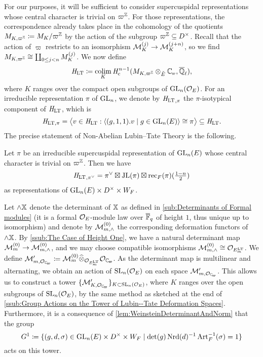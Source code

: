 \documentclass[../main.tex]{subfiles}
\begin{document}
For our purposes, it will be sufficient to consider supercuspidal representations
whose central character is trivial on $\varpi^{\mathbb{Z}}$. For those representations,
the correspondence already takes place in the cohomology of the 
quotients $M_{K, \varpi^{\mathbb{Z}}} \coloneqq M_K/\varpi^{\mathbb{Z}}$ by the action of the
subgroup $\varpi^{\mathbb{Z}} \subseteq D^\times$. Recall that the action of 
$\varpi$ restricts to an isomorphism $\mathcal{M}_K^{(j)} \to \mathcal{M}_K^{(j+n)}$, so we find
$M_{K, \varpi^{\mathbb{Z}}} \cong \coprod_{0 \leq j < n} M_{K}^{(j)}$. We now define
\begin{equation} \label{eq:defHLT}
  \HLT \coloneq \colim_{K} \hHc^{n-1} (M_{K, \varpi^\Z} \otimes_{\br E}\Cp, \bar \Q_\ell),
\end{equation}
where $K$ ranges over the compact open subgroups of $\operatorname{GL}_n(\mathcal{O}_E)$. 
For an irreducible representation $\pi$ of $\operatorname{GL}_n$, we denote by ${\mathit H_{\mathrm{LT}}}_{,\pi}$ the 
$\pi$-isotypical component of $\mathit H_{\mathrm{LT}}$, which is
\begin{equation*}
  \mathit H_{\mathrm{LT}, \pi} = \big\langle v \in \mathit H_{\mathrm{LT}} : \langle (g,1,1).v \mid g \in \operatorname{GL}_n(E) \rangle 
  \cong \pi \big\rangle \subseteq \mathit H_{\mathrm{LT}}.
\end{equation*}
The precise statement of Non-Abelian Lubin--Tate Theory is the following.
\begin{thm}\label{thm:NonAbLTT}
  Let $\pi$ be an irreducible supercuspidal representation of $\operatorname{GL}_n(E)$ whose central
  character is trivial on $\varpi^{\mathbb{Z}}$.   
  Then we have 
  \begin{equation*}
    {\mathit H_{\mathrm{LT}}}_{,\pi^\vee} = \pi^\vee \boxtimes \mathrm{JL}(\pi) \boxtimes \mathrm{rec}_F(\pi)(\tfrac{1-n}2)
  \end{equation*}
  as representations of $\operatorname{GL}_n(E) \times D^\times \times W_F$. 
\end{thm}

Let $\wedge \mathbb{X}$ denote the determinant of $\mathbb{X}$ as defined in 
\cref{sub:Determinants of Formal modules} (it is a formal $\mathcal{O}_E$-module law over
${\overline {\mathbb{F}}_q}$ of height $1$, thus unique up to isomorphism) 
and denote by $\mathcal{M}_{m, \wedge}^{(0)}$ the corresponding deformation functors of
$\wedge \mathbb{X}$. 
By \cref{ssub:The Case of Height One}, we have a natural
determinant map $\mathcal{M}_{m}^{(0)} \to \mathcal{M}_{m ,\wedge}^{(0)}$, and we may choose compatible
isomorphisms $\mathcal{M}_{m, \wedge}^{(0)} \cong \mathcal{O}_{E^{\mathrm{LT}}_m}$. 
We define $\cM'_{m,\cO_\Cp} \coloneq \cM_{m}^{(0)} \cotimes_{\cO_{E^\LT_m}} \cO_\Cp$.
As the determinant map is multilinear and alternating, we obtain an action of 
$\operatorname{SL}_n(\mathcal{O}_E)$ on each space $\cM'_{m,\cO_\Cp}$. This allows us to construct a tower
$\{\cM'_{K, \cO_\Cp}\}_{K \subset \SL_n(\cO_E)}$, where $K$ ranges over the 
open subgroups of $\operatorname{SL}_n(\mathcal{O}_E)$, by the same method as sketched 
at the end of \cref{ssub:Group Actions on the Tower of Lubin--Tate Deformation
Spaces}. Furthermore, it is a consequence of \cref{lem:WeinsteinDeterminantAndNorm}
that the group 
\begin{equation}\label{eq:DefGandG1}
  G^1 \coloneqq \{(g,d,\sigma) \in \operatorname{GL}_n(E) \times D^\times \times W_F \mid 
  \det(g) \operatorname{Nrd}(d)^{-1} \operatorname{Art}_F^{-1}(\sigma) = 1\}
\end{equation}
acts on this tower.
\end{document}
